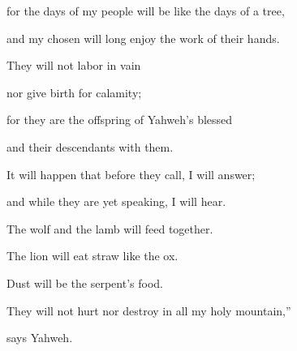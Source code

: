 {\par }{\Q for the days of my people will be like the days of a tree,
\par }{\QB and my chosen will long enjoy the work of their hands.
\par }{\Q {}They will not labor in vain
\par }{\QB nor give birth for calamity;
\par }{\Q for they are the offspring of Yahweh’s blessed
\par }{\QB and their descendants with them.
\par }{\Q {}It will happen that before they call, I will answer;
\par }{\QB and while they are yet speaking, I will hear.
\par }{\Q {}The wolf and the lamb will feed together.
\par }{\QB The lion will eat straw like the ox.
\par }{\QB Dust will be the serpent’s food.
\par }{\Q They will not hurt nor destroy in all my holy mountain,”
\par }{\QB says Yahweh.

}
